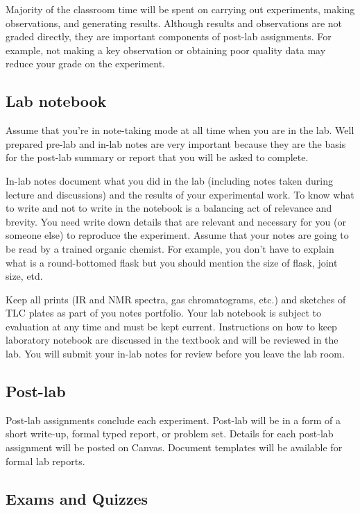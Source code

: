 Majority of the classroom time will be spent on carrying out
experiments, making observations, and generating results. Although
results and observations are not graded directly, they are important
components of post-lab assignments. For example, not making a key
observation or obtaining poor quality data may reduce your grade on the
experiment.

\hypertarget{sec:lab-notebook}{%
\subsection{Lab notebook}\label{sec:lab-notebook}}

Assume that you're in note-taking mode at all time when you are in the
lab. Well prepared pre-lab and in-lab notes are very important because
they are the basis for the post-lab summary or report that you will be
asked to complete.

In-lab notes document what you did in the lab (including notes taken
during lecture and discussions) and the results of your experimental
work. To know what to write and not to write in the notebook is a
balancing act of relevance and brevity. You need write down details that
are relevant and necessary for you (or someone else) to reproduce the
experiment. Assume that your notes are going to be read by a trained
organic chemist. For example, you don't have to explain what is a
round-bottomed flask but you should mention the size of flask, joint
size, etd.

Keep all prints (IR and NMR spectra, gas chromatograms, etc.) and
sketches of TLC plates as part of you notes portfolio. Your lab notebook
is subject to evaluation at any time and must be kept current.
Instructions on how to keep laboratory notebook are discussed in the
textbook and will be reviewed in the lab. You will submit your in-lab
notes for review before you leave the lab room.

\hypertarget{sec:post-lab}{%
\subsection{Post-lab}\label{sec:post-lab}}

Post-lab assignments conclude each experiment. Post-lab will be in a
form of a short write-up, formal typed report, or problem set. Details
for each post-lab assignment will be posted on Canvas. Document
templates will be available for formal lab reports.

\hypertarget{sec:exams-and-quizzes}{%
\subsection{Exams and Quizzes}\label{sec:exams-and-quizzes}}

